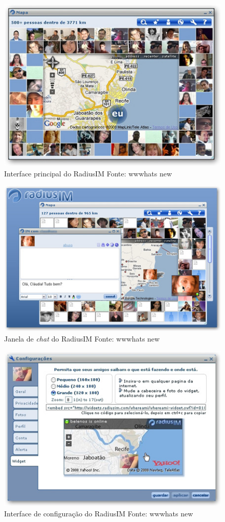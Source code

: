 \begin{figure}[]
	\centering
	\includegraphics[scale=0.9]{imagens/radiusim.jpg}
	\caption{\small Interface principal do RadiusIM Fonte: wwwhats new \cite{radiusim}}
	\label{fig:radiusim-principal}
\end{figure}

\begin{figure}[]
	\centering
	\includegraphics[scale=0.9]{imagens/radiusim2.jpg}
	\caption{\small Janela de \textit{chat} do RadiusIM Fonte: wwwhats new \cite{radiusim}}
	\label{fig:radiusim-chat}
\end{figure}

\begin{figure}[]
	\centering
	\includegraphics[scale=0.9]{imagens/radiusim3.jpg}
	\caption{\small Interface de configuração do RadiusIM Fonte: wwwhats new \cite{radiusim}}
	\label{fig:radiusim-configs}
\end{figure}


